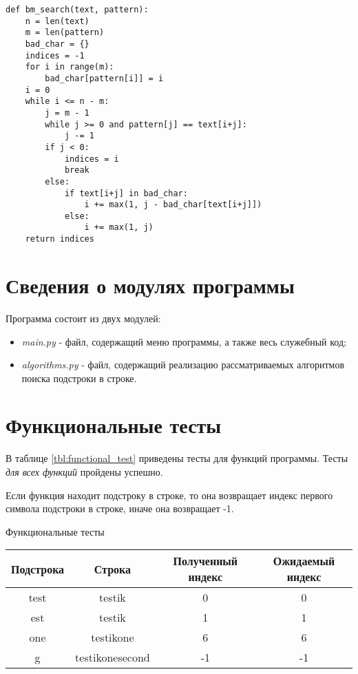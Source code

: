 \begin{center}
    \captionsetup{justification=raggedright,singlelinecheck=off}
    \begin{lstlisting}[label=lst:bm,caption=Модифицированный алгоритм с использованием эвристики <<плохого>> символа]
def bm_search(text, pattern):
	n = len(text)
	m = len(pattern)
	bad_char = {}
	indices = -1
	for i in range(m):
		bad_char[pattern[i]] = i
	i = 0
	while i <= n - m:
		j = m - 1
		while j >= 0 and pattern[j] == text[i+j]:
			j -= 1
		if j < 0:
			indices = i
			break
		else:
			if text[i+j] in bad_char:
				i += max(1, j - bad_char[text[i+j]])
			else:
				i += max(1, j)
	return indices
\end{lstlisting}
\end{center}


\section{Сведения о модулях программы}
Программа состоит из двух модулей:
\begin{itemize}
	\item \textit{main.py} - файл, содержащий меню программы, а также весь служебный код;
    \item \textit{algorithms.py} - файл, содержащий реализацию рассматриваемых алгоритмов поиска подстроки в строке.
\end{itemize}


\section{Функциональные тесты}

В таблице \ref{tbl:functional_test} приведены тесты для функций программы.
Тесты \textit{для всех функций} пройдены успешно.

Если функция находит подстроку в строке, то она возвращает индекс первого символа подстроки в строке, иначе она возвращает -1.


\begin{center}
	\begin{threeparttable}
    \captionsetup{justification=raggedright,singlelinecheck=off}
    \caption{Функциональные тесты}
    \label{tbl:functional_test}
    \begin{tabular}{|c|c|c|c|} 
    \hline
	Подстрока & Строка & Полученный индекс & Ожидаемый индекс \\ \hline
	test & testik & 0 & 0 \\ \hline
	est & testik & 1 & 1 \\ \hline
	one & testikone & 6 & 6 \\ \hline
	g & testikonesecond & -1 & -1 \\ \hline
	\end{tabular}
	\end{threeparttable}
\end{center}

